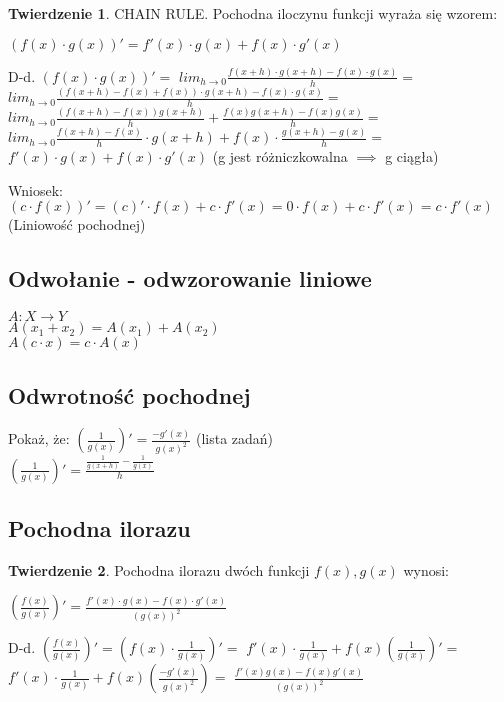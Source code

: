 \documentclass{article}
\theoremstyle{definition}
\theoremstyle{definition}
\newtheorem{tw}{Twierdzenie}[subsection]
\theoremstyle{definition}
\theoremstyle{definition}
\begin{document}
\begin{tw}
    CHAIN RULE. Pochodna iloczynu funkcji wyraża się wzorem:
    \begin{center}
        $(f(x)\cdot g(x))'=f'(x)\cdot g(x) + f(x)\cdot g'(x)$
    \end{center}
    D-d.
    $(f(x)\cdot g(x))'=$
    $lim_{h\rightarrow 0} \frac{f(x+h)\cdot g(x+h)-f(x)\cdot g(x)}{h}=$
    $lim_{h\rightarrow 0} \frac{(f(x+h)-f(x)+f(x))\cdot g(x+h)-f(x)\cdot g(x)}{h}=$
    $lim_{h\rightarrow 0} \frac{(f(x+h)-f(x))g(x+h)}{h} + \frac{f(x)g(x+h)-f(x)g(x)}{h}=$
    $lim_{h\rightarrow 0} \frac{f(x+h)-f(x)}{h}\cdot g(x+h) + f(x)\cdot \frac{g(x+h)-g(x)}{h}=$
    $f'(x)\cdot g(x) + f(x)\cdot g'(x)$ (g jest różniczkowalna $\implies$ g ciągła)
\end{tw}
Wniosek: $(c\cdot f(x))' = (c)'\cdot f(x) + c\cdot f'(x) = 0\cdot f(x) + c\cdot f'(x) = c\cdot f'(x)$ (Liniowość pochodnej)

\subsection{Odwołanie - odwzorowanie liniowe}

$A: X\rightarrow Y$\\
$A(x_1+x_2)=A(x_1)+A(x_2)$\\
$A(c\cdot x)=c\cdot A(x)$

\subsection{Odwrotność pochodnej}

Pokaż, że: $\left(\frac{1}{g(x)}\right)'=\frac{-g'(x)}{g(x)^2}$ (lista zadań)\\
$\left(\frac{1}{g(x)}\right)' = \frac{\frac{1}{g(x+h)}-\frac{1}{g(x)}}{h}$

\subsection{Pochodna ilorazu}

\begin{tw}
    Pochodna ilorazu dwóch funkcji $f(x), g(x)$ wynosi:
    \begin{center}
        $\left(\frac{f(x)}{g(x)}\right)'=\frac{f'(x)\cdot g(x)-f(x)\cdot g'(x)}{\left(g(x)\right)^2}$
    \end{center}
    D-d. $\left(\frac{f(x)}{g(x)}\right)'=\left(f(x)\cdot \frac{1}{g(x)}\right)'=$
    $f'(x)\cdot\frac{1}{g(x)} + f(x)\left(\frac{1}{g(x)}\right)'=$
    $f'(x)\cdot\frac{1}{g(x)} + f(x)\left(\frac{-g'(x)}{g(x)^2}\right)=$
    $\frac{f'(x)g(x)-f(x)g'(x)}{\left(g(x)\right)^2}$
\end{tw}
\end{document}
